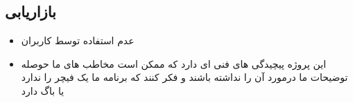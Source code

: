 \documentclass{article}
\begin{document}
		\subsection{بازاریابی}
		\begin{itemize}
			\item عدم استفاده توسط کاربران
			\item این پروژه پیچیدگی های فنی ای دارد که ممکن است مخاطب های ما حوصله توضیحات ما درمورد آن را نداشته باشند و فکر کنند که برنامه ما یک فیچر را ندارد یا باگ دارد 
		\end{itemize}
\end{document}
